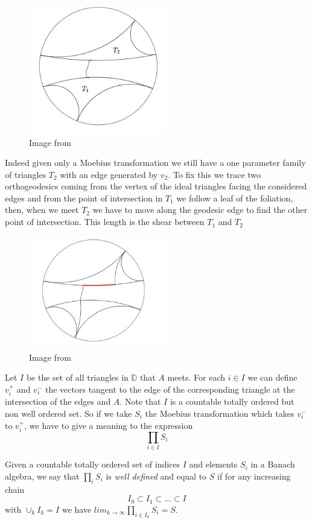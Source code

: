 \begin{figure}[h!]
\centering
\includegraphics[width=6cm]{Image/Foliation.jpg}
\caption{Image from \cite{wright2018mirzakhani}}
\end{figure}

Indeed given only a Moebius transformation we still have a one parameter family of triangles $T_2$ with an edge generated by $v_2$. To fix this we trace two orthogeodesics coming from the vertex of the ideal triangles facing the considered edges and from the point of intersection in $T_1$ we follow a leaf of the foliation, then, when we meet $T_2$ we have to move along the geodesic edge to find the other point of intersection. This length is the shear between $T_1$ and $T_2$

\begin{figure}[h!]
\centering
\includegraphics[width=6cm]{Image/Shear.jpg}
\caption{Image from \cite{wright2018mirzakhani}}
\end{figure}

Let $I$ be the set of all triangles in $\mathbb{D}$ that $A$ meets. For each $i\in I$ we can define $v_i^+$ and $v_i^-$ the vectors tangent to the edge of the corresponding triangle at the intersection of the edges and $A$. Note that $I$ is a countable totally ordered but non well ordered set. So if we take $S_i$ the Moebius transformation which takes $v_i^-$ to $v_i^+$, we have to give a meaning to the expression \[
\prod_{i\in I}S_i
\]

\begin{dfnt}
Given a countable totally ordered set of indices $I$ and elements $S_i$ in a Banach algebra, we say that $\prod_i S_i$ is \emph{well defined} and equal to $S$ if for any increasing chain \[
I_0 \subset I_1 \subset ... \subset I
\]
with $\cup_k I_k=I$ we have $lim_{k \to \infty} \prod_{i \in I_k}S_i =S $.
\end{dfnt}

